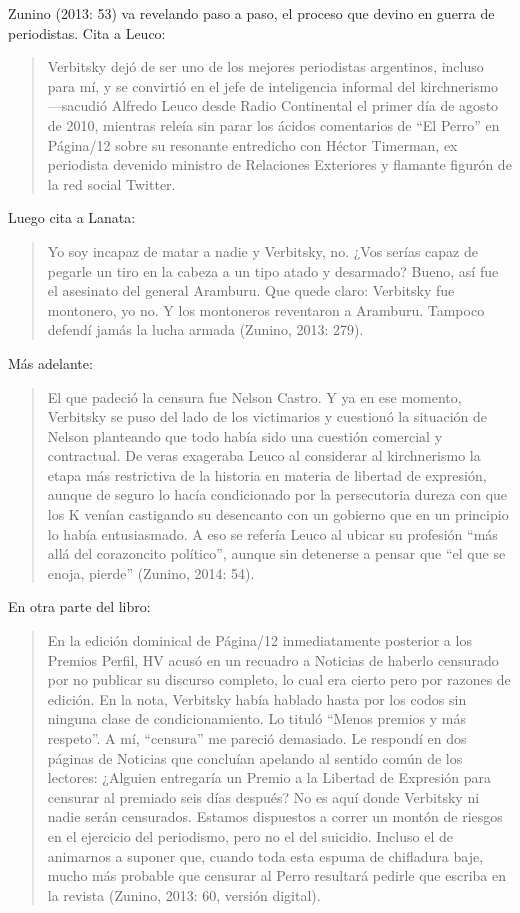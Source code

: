 Zunino (2013: 53) va revelando paso a paso, el proceso que devino en guerra de periodistas. Cita a Leuco:

\begin{quote}
Verbitsky dejó de ser uno de los mejores periodistas argentinos, incluso para mí, y se convirtió en el jefe de inteligencia informal del kirchnerismo ---sacudió Alfredo Leuco desde Radio Continental el primer día de agosto de 2010, mientras releía sin parar los ácidos comentarios de ``El Perro'' en Página/12 sobre su resonante entredicho con Héctor Timerman, ex periodista devenido ministro de Relaciones Exteriores y flamante figurón de la red social Twitter.
\end{quote}

Luego cita a Lanata:

\begin{quote}
Yo soy incapaz de matar a nadie y Verbitsky, no. ¿Vos serías capaz de pegarle un tiro en la cabeza a un tipo atado y desarmado? Bueno, así fue el asesinato del general Aramburu. Que quede claro: Verbitsky fue montonero, yo no. Y los montoneros reventaron a Aramburu. Tampoco defendí jamás la lucha armada (Zunino, 2013: 279).
\end{quote}

Más adelante:

\begin{quote}
El que padeció la censura fue Nelson Castro. Y ya en ese momento, Verbitsky se puso del lado de los victimarios y cuestionó la situación de Nelson planteando que todo había sido una cuestión comercial y contractual. De veras exageraba Leuco al considerar al kirchnerismo la etapa más restrictiva de la historia en materia de libertad de expresión, aunque de seguro lo hacía condicionado por la persecutoria dureza con que los K venían castigando su desencanto con un gobierno que en un principio lo había entusiasmado. A eso se refería Leuco al ubicar su profesión ``más allá del corazoncito político'', aunque sin detenerse a pensar que ``el que se enoja, pierde'' (Zunino, 2014: 54).
\end{quote}

En otra parte del libro:

\begin{quote}
En la edición dominical de Página/12 inmediatamente posterior a los Premios Perfil, HV acusó en un recuadro a Noticias de haberlo censurado por no publicar su discurso completo, lo cual era cierto pero por razones de edición. En la nota, Verbitsky había hablado hasta por los codos sin ninguna clase de condicionamiento. Lo tituló ``Menos premios y más respeto''. A mí, ``censura'' me pareció demasiado. Le respondí en dos páginas de Noticias que concluían apelando al sentido común de los lectores: ¿Alguien entregaría un Premio a la Libertad de Expresión para censurar al premiado seis días después? No es aquí donde Verbitsky ni nadie serán censurados. Estamos dispuestos a correr un montón de riesgos en el ejercicio del periodismo, pero no el del suicidio. Incluso el de animarnos a suponer que, cuando toda esta espuma de chifladura baje, mucho más probable que censurar al Perro resultará pedirle que escriba en la revista (Zunino, 2013: 60, versión digital).
\end{quote}

